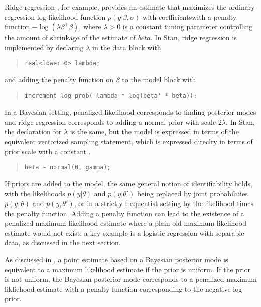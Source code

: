 Ridge regression \citep{HoerlKennard:1970}, for example, provides an
estimate that maximizes the ordinary regression log likelihood
function $p(y|\beta,\sigma)$ with coefficientswith a penalty function
$-\log (\lambda \beta^{\top} \beta)$, where $\lambda > 0$ is a
constant tuning parameter controlling the amount of shrinkage of the
estimate of $beta$.  In Stan, ridge regression is implemented by
declaring $\lambda$ in the data block with
%
\begin{quote}
\begin{Verbatim}
real<lower=0> lambda;
\end{Verbatim}
\end{quote}
and adding the penalty function on $\beta$ to the model block with
%
\begin{quote}
\begin{Verbatim}
increment_log_prob(-lambda * log(beta' * beta));
\end{Verbatim}
\end{quote}
%
In a Bayesian setting, penalized likelihood corresponds to finding
posterior modes and ridge regression corresponds to adding a normal
prior with scale $2\lambda$.  In Stan, the declaration for $\lambda$
is the same, but the model is expressed in terms of the equivalent
vectorized sampling statement, which is expressed direclty in terms of
prior scale with a constant .  
%
\begin{quote}
\begin{Verbatim}
beta ~ normal(0, gamma);
\end{Verbatim}
\end{quote}



If priors are added to the model, the same general notion of
identifiability holds, with the likelihoods $p(y|\theta)$ and
$p(y|\theta')$ being replaced by joint probabilities $p(y,\theta)$ and
$p(y,\theta')$, or in a strictly frequentist setting by the likelihood
times the penalty function.  Adding a penalty function can lead to the
existence of a penalized maximum likelihood estimate where a plain old
maximum likelihood estimate would not exist; a key example is a
logistic regression with separable data, as discussed in the next
section.



As discussed in , a point estimate based on a Bayesian
posterior mode is equivalent to a maximum likelihood estimate if the
prior is uniform.  If the prior is not uniform, the Bayesian posterior
mode corresponds to a penalized maximum likliehood estimate with a
penalty function corresponding to the negative log prior.




